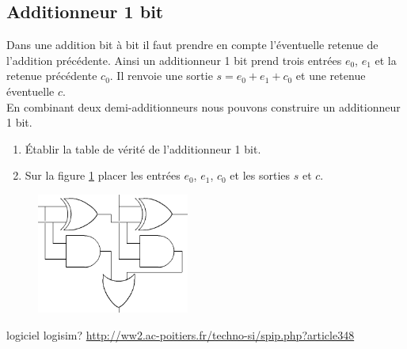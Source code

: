 \documentclass[a4paper,11pt]{article}
\begin{document}
\begin{Form}
\subsection{Additionneur 1 bit}
Dans une addition bit à bit il faut prendre en compte l'éventuelle retenue de l'addition précédente. Ainsi un additionneur 1 bit prend trois entrées $e_0$, $e_1$ et la retenue précédente $c_0$. Il renvoie une sortie $s=e_0+e_1+c_0$ et une retenue éventuelle $c$.\\
En combinant deux demi-additionneurs nous pouvons construire un additionneur 1 bit.
\begin{activite}
\begin{enumerate}
\item Établir la table de vérité de l'additionneur 1 bit.
\item Sur la figure \ref{additionneur} placer les entrées $e_0$, $e_1$, $c_0$ et les sorties $s$ et $c$.
\end{enumerate}
\end{activite}
\begin{figure}[!h]
\centering
\includegraphics[width=5cm]{ressources/additionneur.png}
\label{additionneur}
\end{figure}


\begin{commentprof}
logiciel logisim? \url{http://ww2.ac-poitiers.fr/techno-si/spip.php?article348}
\end{commentprof}
\end{Form}
\end{document}
